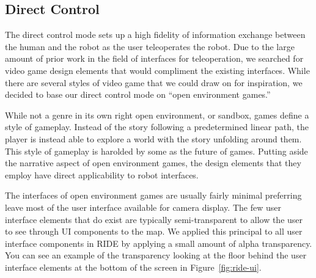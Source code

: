
% 
% 
% 
% 

\subsection{Direct Control}

The direct control mode sets up a high fidelity of information exchange between the human and the robot as the user teleoperates the robot. Due to the large amount of prior work in the field of interfaces for teleoperation, we searched for video game design elements that would compliment the existing interfaces. While there are several styles of video game that we could draw on for inspiration, we decided to base our direct control mode on ``open environment games.''

While not a genre in its own right open environment, or sandbox, games define a style of gameplay. Instead of the story following a predetermined linear path, the player is instead able to explore a world with the story unfolding around them. This style of gameplay is harolded by some as the future of games. Putting aside the narrative aspect of open environment games, the design elements that they employ have direct applicability to robot interfaces.


The interfaces of open environment games are usually fairly minimal preferring leave most of the user interface available for camera display. The few user interface elements that do exist are typically semi-transparent to allow the user to see through UI components to the map. We applied this principal to all user interface components in RIDE by applying a small amount of alpha transparency. You can see an example of the transparency looking at the floor behind the user interface elements at the bottom of the screen in Figure~\ref{fig:ride-ui}.

